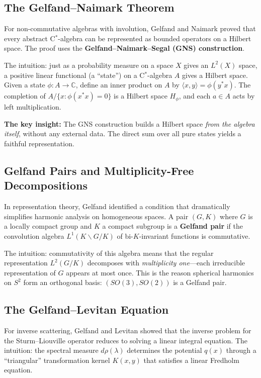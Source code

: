 \subsection{The Gelfand--Naimark Theorem}

For non-commutative algebras with involution, Gelfand and Naimark proved that every abstract C$^*$-algebra can be represented as bounded operators on a Hilbert space. The proof uses the \textbf{Gelfand--Naimark--Segal (GNS) construction}.

The intuition: just as a probability measure on a space $X$ gives an $L^2(X)$ space, a positive linear functional (a ``state'') on a C$^*$-algebra $A$ gives a Hilbert space. Given a state $\phi: A \to \mathbb{C}$, define an inner product on $A$ by $\langle x, y \rangle = \phi(y^* x)$. The completion of $A/\{x: \phi(x^* x) = 0\}$ is a Hilbert space $H_\phi$, and each $a \in A$ acts by left multiplication.

\textbf{The key insight:} The GNS construction builds a Hilbert space \textit{from the algebra itself}, without any external data. The direct sum over all pure states yields a faithful representation.

\subsection{Gelfand Pairs and Multiplicity-Free Decompositions}

In representation theory, Gelfand identified a condition that dramatically simplifies harmonic analysis on homogeneous spaces. A pair $(G,K)$ where $G$ is a locally compact group and $K$ a compact subgroup is a \textbf{Gelfand pair} if the convolution algebra $L^1(K\backslash G/K)$ of bi-$K$-invariant functions is commutative.

The intuition: commutativity of this algebra means that the regular representation $L^2(G/K)$ decomposes with \textit{multiplicity one}---each irreducible representation of $G$ appears at most once. This is the reason spherical harmonics on $S^2$ form an orthogonal basis: $(SO(3), SO(2))$ is a Gelfand pair.

\subsection{The Gelfand--Levitan Equation}

For inverse scattering, Gelfand and Levitan showed that the inverse problem for the Sturm--Liouville operator reduces to solving a linear integral equation. The intuition: the spectral measure $d\rho(\lambda)$ determines the potential $q(x)$ through a ``triangular'' transformation kernel $K(x,y)$ that satisfies a linear Fredholm equation.

